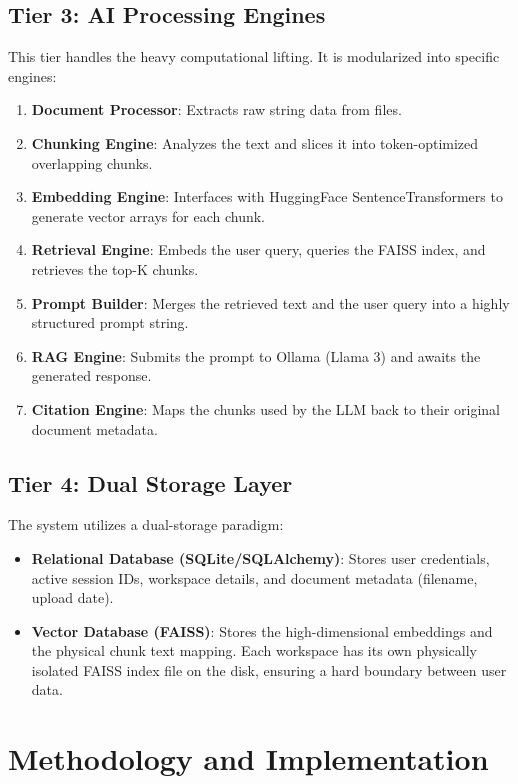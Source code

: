 \documentclass[12pt, a4paper]{report}
\begin{document}
\section{Tier 3: AI Processing Engines}
This tier handles the heavy computational lifting. It is modularized into specific engines:
\begin{enumerate}
    \item \textbf{Document Processor}: Extracts raw string data from files.
    \item \textbf{Chunking Engine}: Analyzes the text and slices it into token-optimized overlapping chunks.
    \item \textbf{Embedding Engine}: Interfaces with HuggingFace SentenceTransformers to generate vector arrays for each chunk.
    \item \textbf{Retrieval Engine}: Embeds the user query, queries the FAISS index, and retrieves the top-K chunks.
    \item \textbf{Prompt Builder}: Merges the retrieved text and the user query into a highly structured prompt string.
    \item \textbf{RAG Engine}: Submits the prompt to Ollama (Llama 3) and awaits the generated response.
    \item \textbf{Citation Engine}: Maps the chunks used by the LLM back to their original document metadata.
\end{enumerate}

\section{Tier 4: Dual Storage Layer}
The system utilizes a dual-storage paradigm:
\begin{itemize}
    \item \textbf{Relational Database (SQLite/SQLAlchemy)}: Stores user credentials, active session IDs, workspace details, and document metadata (filename, upload date).
    \item \textbf{Vector Database (FAISS)}: Stores the high-dimensional embeddings and the physical chunk text mapping. Each workspace has its own physically isolated FAISS index file on the disk, ensuring a hard boundary between user data.
\end{itemize}

\chapter{Methodology and Implementation}
\end{document}
